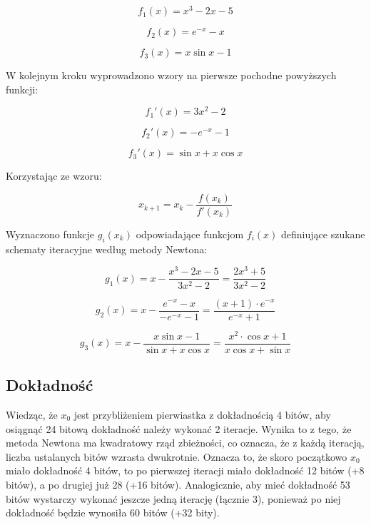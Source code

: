\documentclass{article}
\begin{document}
	\begin{equation}
		f_1(x) = x^3 - 2x -5
	\end{equation}

	\begin{equation}
		f_2(x) = e^{-x} - x
	\end{equation}

	\begin{equation}
		f_3(x) = x \sin x - 1
	\end{equation}


	W kolejnym kroku wyprowadzono wzory na pierwsze pochodne powyższych funkcji:

	\begin{equation}
		f_1'(x) = 3x^2 - 2
	\end{equation}

	\begin{equation}
		f_2'(x) = -e^{-x} - 1
	\end{equation}

	\begin{equation}
		f_3'(x) = \sin x + x \cos x
	\end{equation}

	Korzystając ze wzoru:

	\begin{equation}
		x_{k+1} = x_k - \frac{f(x_k)}{f'(x_k)} 
	\end{equation}

	Wyznaczono funkcje $g_i(x_k)$ odpowiadające funkcjom $f_i(x)$ definiujące szukane schematy iteracyjne według metody Newtona:

	\begin{equation}
		g_1(x) = x - \frac{x^3 - 2x -5}{3x^2 - 2} = \frac{2x^3+5}{3x^2-2}
	\end{equation}

	\begin{equation}
		g_2(x) = x - \frac{e^{-x} - x}{-e^{-x} - 1} = \frac{(x+1) \cdot e^{-x}}{e^{-x} + 1}
	\end{equation}

	\begin{equation}
		g_3(x) = x - \frac{x \sin x - 1}{\sin x + x \cos x} = \frac{x^2 \cdot \cos x + 1}{x \cos x + \sin x}
	\end{equation}

	\subsection*{Dokładność}

	Wiedząc, że $x_0$ jest przybliżeniem pierwiastka z dokładnością 4 bitów, aby osiągnąć 24 bitową dokładność należy wykonać 2 iteracje. Wynika to z tego, że metoda Newtona ma kwadratowy rząd zbieżności, co oznacza, że z każdą iteracją, liczba ustalanych bitów wzrasta dwukrotnie. Oznacza to, że skoro początkowo $x_0$ miało dokładność 4 bitów, to po pierwszej iteracji miało dokładność 12 bitów (+8 bitów), a po drugiej już 28 (+16 bitów). Analogicznie, aby mieć dokładność 53 bitów wystarczy wykonać jeszcze jedną iterację (łącznie 3), ponieważ po niej dokładność będzie wynosiła 60 bitów (+32 bity).
\end{document}
